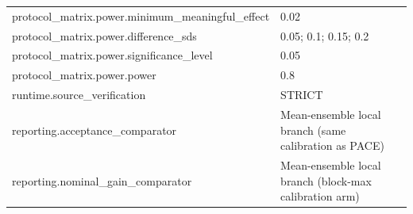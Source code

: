 \begin{tabular}{ll}
protocol\_matrix.power.minimum\_meaningful\_effect & 0.02 \\
protocol\_matrix.power.difference\_sds & 0.05; 0.1; 0.15; 0.2 \\
protocol\_matrix.power.significance\_level & 0.05 \\
protocol\_matrix.power.power & 0.8 \\
runtime.source\_verification & STRICT \\
reporting.acceptance\_comparator & Mean-ensemble local branch (same calibration as PACE) \\
reporting.nominal\_gain\_comparator & Mean-ensemble local branch (block-max calibration arm) \\
\bottomrule
\end{tabular}
